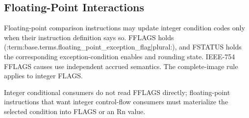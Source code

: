 \subsection{Floating-Point Interactions}
Floating-point comparison instructions may update integer condition codes only when their instruction definition says
so. FFLAGS holds (:term:base.terms.floating_point_exception_flag|plural:), and FSTATUS holds the corresponding exception-condition enables
and rounding state. IEEE-754 FFLAGS causes use independent accrued semantics. The complete-image rule applies to
integer FLAGS.

Integer conditional consumers do not read FFLAGS directly; floating-point instructions that want integer control-flow
consumers must materialize the selected condition into FLAGS or an Rn value.

